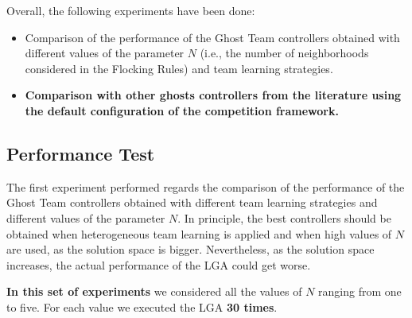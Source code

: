 \documentclass[journal]{IEEEtran}
\begin{document}
Overall, the following experiments have been done:

\begin{itemize}
  \item Comparison of the performance of the Ghost Team controllers obtained with different values of the parameter $N$ (i.e., the number of neighborhoods considered in the Flocking Rules) and team learning strategies.
  \item \textbf{Comparison with other ghosts controllers from the literature using the default configuration of the competition framework.}
\end{itemize}

\subsection{Performance Test}
The first experiment performed regards the comparison of the performance of the Ghost Team controllers obtained with different team learning strategies and different values of the parameter $N$. In principle, the best controllers should be obtained when heterogeneous team learning is applied and when high values of $N$ are used, as the solution space is bigger. Nevertheless, as the solution space increases, the actual performance of the LGA could get worse.

\textbf{In this set of experiments }we considered all the values of $N$ ranging from one to five. For each value we executed the LGA \textbf{30 times}.
\end{document}
